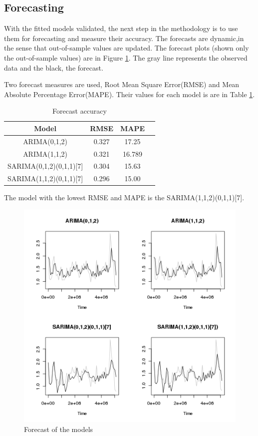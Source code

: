 \subsection{Forecasting}
With the fitted models validated, the next step in the methodology is to use them for forecasting and measure their accuracy. The forecasts are dynamic,in the sense that out-of-sample values are updated. The forecast plots (shown only the out-of-sample values) are in Figure \ref{fig:forecast_all}. The gray line represents the observed data and the black, the forecast. 

Two forecast measures are used, Root Mean Square Error(RMSE) and Mean Absolute Percentage Error(MAPE). Their values for each model is are in Table \ref{tb:accuracy}. 

\begin{table}[!hb]
\begin{center}
\caption{Forecast accuracy}\label{tb:accuracy}
\begin{tabular}{cccc}
Model & RMSE & MAPE  \\\hline
ARIMA(0,1,2) & 	0.327 & 17.25 \\
ARIMA(1,1,2) & 0.321 & 16.789 \\
SARIMA(0,1,2)(0,1,1)[7] & 0.304 & 15.63  \\
SARIMA(1,1,2)(0,1,1)[7] & 0.296 & 15.00  \\ \hline
\end{tabular}
\end{center}
\end{table}

The model with the lowest RMSE and MAPE is the SARIMA(1,1,2)(0,1,1)[7]. 
\begin{figure}[!htb]
\begin{center}
\includegraphics[width=\textwidth]{forecast_all.png}    %
\caption{Forecast of the models} 
\label{fig:forecast_all}
\end{center}
\end{figure}